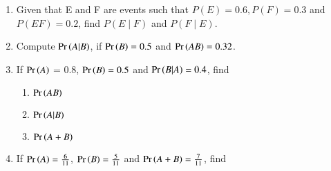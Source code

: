 \begin{enumerate}[label=\thesubsection.\arabic*,ref=\thesubsection.\theenumi]
	\item 
Given that E and F are events such that $P(E)=0.6, P(F)=0.3$ and $P(E F)=0.2$, find $P(E \mid F)$ and $P(F \mid E)$.
\\

	\item Compute $\Pr\left(A|B\right)$, if $\Pr\left(B\right)=0.5$ and $\Pr\left(AB\right)=0.32$. 
		\\
		\solution
		
	\item If $\Pr\left(A\right)$ = 0.8, $\Pr\left(B\right) = 0.5$ and $\Pr\left(B \vert A\right) = 0.4$, find  
\begin{multicols}{3}
\begin{enumerate}
\item
$\Pr\left(AB\right)$ 
\item
 $\Pr\left(A \vert B\right)$
\item
 $\Pr\left(A+B\right)$
\end{enumerate}
\end{multicols}
\solution

	\item If $\Pr\left(A\right)=\frac{6}{11}$, $\Pr\left(B\right)=\frac{5}{11}$ and $\Pr\left(A+B\right)=\frac{7}{11}$, find


\end{enumerate}
